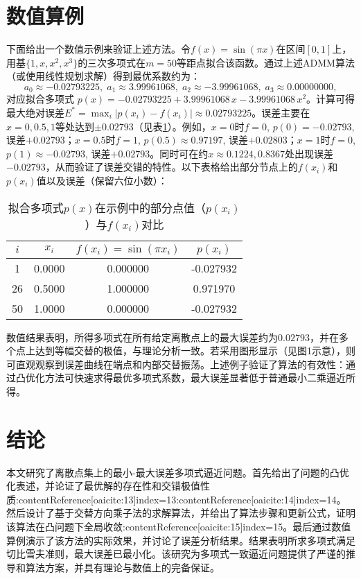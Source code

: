 \documentclass{article}
\begin{document}
\section{数值算例}
下面给出一个数值示例来验证上述方法。令$f(x)=\sin(\pi x)$在区间$[0,1]$上，用基$\{1,x,x^2,x^3\}$的三次多项式在$m=50$等距点拟合该函数。通过上述ADMM算法（或使用线性规划求解）得到最优系数约为：
\[
a_0\approx -0.02793225,\;
a_1\approx 3.99961068,\;
a_2\approx -3.99961068,\;
a_3\approx 0.00000000,
\]
对应拟合多项式
$p(x)=-0.02793225 +3.99961068\,x -3.99961068\,x^2$。计算可得最大绝对误差$E^*=\max_i|p(x_i)-f(x_i)|\approx0.02793225$。误差主要在$x=0,0.5,1$等处达到$\pm0.02793$（见表\ref{tab:err}）。例如，$x=0$时$f=0$, $p(0)=-0.02793$, 误差$+0.02793$；$x=0.5$时$f=1$, $p(0.5)\approx0.97197$, 误差$+0.02803$；$x=1$时$f=0$, $p(1)\approx -0.02793$, 误差$+0.02793$。同时可在约$x\approx0.1224,0.8367$处出现误差$-0.02793$，从而验证了误差交错的特性。以下表格给出部分节点上的$f(x_i)$和$p(x_i)$值以及误差（保留六位小数）：
\begin{table}[ht]
\centering
\begin{tabular}{c|c c c}
$i$ & $x_i$ & $f(x_i)=\sin(\pi x_i)$ & $p(x_i)$ \\
\hline
1 & 0.0000 & 0.000000 & -0.027932 \\
26 & 0.5000 & 1.000000 & 0.971970 \\
50 & 1.0000 & 0.000000 & -0.027932 \\
\end{tabular}
\caption{拟合多项式$p(x)$在示例中的部分点值（$p(x_i)$）与$f(x_i)$对比}
\label{tab:err}
\end{table}

数值结果表明，所得多项式在所有给定离散点上的最大误差约为$0.02793$，并在多个点上达到等幅交替的极值，与理论分析一致。若采用图形显示（见图1示意），则可直观观察到误差曲线在端点和内部交替振荡。上述例子验证了算法的有效性：通过凸优化方法可快速求得最优多项式系数，最大误差显著低于普通最小二乘逼近所得。

\section{结论}
本文研究了离散点集上的最小-最大误差多项式逼近问题。首先给出了问题的凸优化表述，并论证了最优解的存在性和交错极值性质:contentReference[oaicite:13]{index=13}:contentReference[oaicite:14]{index=14}。然后设计了基于交替方向乘子法的求解算法，并给出了算法步骤和更新公式，证明该算法在凸问题下全局收敛:contentReference[oaicite:15]{index=15}。最后通过数值算例演示了该方法的实际效果，并讨论了误差分析结果。结果表明所求多项式满足切比雪夫准则，最大误差已最小化。该研究为多项式一致逼近问题提供了严谨的推导和算法方案，并具有理论与数值上的完备保证。 


\end{document}
